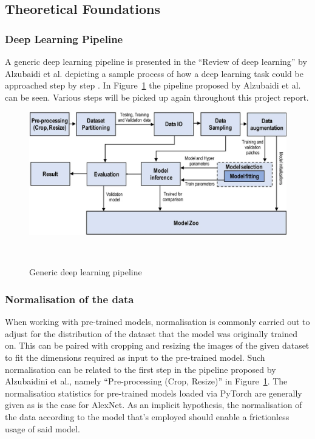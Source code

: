 \subsection{Theoretical Foundations}\label{foundations}


\subsubsection{Deep Learning Pipeline}
A generic deep learning pipeline is presented in the ``Review of deep learning'' by Alzubaidi et al\@. depicting a sample process of how a deep learning task could be approached step by step \citep{alzubaidi2021review}. In Figure~\ref{fig:pipeline} the pipeline proposed by Alzubaidi et al\@. can be seen. Various steps will be picked up again throughout this project report.
\begin{figure}[ht]
	\centering
	\includegraphics[scale=0.26]{./figures/Pipeline.png}
	\caption{Generic deep learning pipeline}~\label{fig:pipeline}
\end{figure}

\subsubsection{Normalisation of the data}
When working with pre-trained models, normalisation is commonly carried out to adjust for the distribution of the dataset that the model was originally trained on. This can be paired with cropping and resizing the images of the given dataset to fit the dimensions required as input to the pre-trained model. Such normalisation can be related to the first step in the pipeline proposed by Alzubaidini et al., namely  ``Pre-processing (Crop, Resize)'' in Figure~\ref{fig:pipeline}. The normalisation statistics for pre-trained models loaded via PyTorch are generally given as is the case for AlexNet\citep{pytorchAlexNet}. As an implicit hypothesis, the normalisation of the data according to the model that's employed should enable a frictionless usage of said model.


